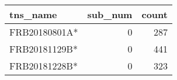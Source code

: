 \begin{tabular}{lrr}
\toprule
tns_name & sub_num & count \\
\midrule
FRB20180801A* & 0 & 287 \\
FRB20181129B* & 0 & 441 \\
FRB20181228B* & 0 & 323 \\
\bottomrule
\end{tabular}
